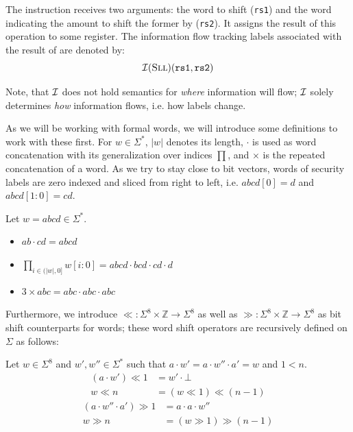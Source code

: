 \begin{example}
    The  instruction receives two arguments: the word to shift (\texttt{rs1}) and the word indicating the amount to shift the former by (\texttt{rs2}).
    It assigns the result of this operation to some register.
    The information flow tracking labels associated with the result of  are denoted by:
    \begin{equation*}
        \mathcal{I}(\textsc{Sll})(\texttt{rs1}, \texttt{rs2})
    \end{equation*}

    Note, that $ \mathcal{I} $ does not hold semantics for \textit{where} information will flow; $ \mathcal{I} $ solely determines \textit{how} information flows, i.e. how labels change.
\end{example}

As we will be working with formal words, we will introduce some definitions to work with these first.
For $ w  \in \Sigma^* $, $ |w| $ denotes its length,
$ \cdot $ is used as word concatenation with its generalization over indices $ \prod $, and $ \times $ is the repeated concatenation of a word.
As we try to stay close to bit vectors, words of security labels are zero indexed and sliced from right to left, i.e. $ abcd[0] = d $ and $ abcd[1:0] = cd $.

\begin{example}
    Let $ w = abcd \in \Sigma^* $.
    \begin{itemize}
        \item $ ab \cdot cd = abcd $
        \item $ \prod_{i \in (|w|, 0]} w[i:0] = abcd \cdot bcd \cdot cd \cdot d $
        \item $ 3 \times abc = abc \cdot abc \cdot abc $
    \end{itemize}
\end{example}

Furthermore, we introduce $ \ll : \Sigma^8 \times \mathbb{Z} \rightarrow \Sigma^8 $ as well as $ \gg : \Sigma^8 \times \mathbb{Z} \rightarrow \Sigma^8 $ as bit shift counterparts for words; these word shift operators are recursively defined on $ \Sigma $ as follows:

Let $ w \in \Sigma^8 $ and $ w', w'' \in \Sigma^* $ such that $ a \cdot w' = a \cdot w'' \cdot a' = w $ and $ 1 < n $.
\begin{align*}
    (a \cdot w') \ll 1 &= w' \cdot \bot \\
    w \ll n &= (w \ll 1) \ll (n - 1)
\end{align*}
\begin{align*}
    (a \cdot w'' \cdot a') \gg 1 &= a \cdot a \cdot w'' \\
    w \gg n &= (w \gg 1) \gg (n - 1)
\end{align*}

